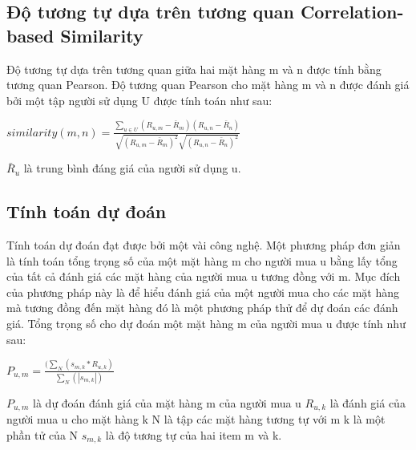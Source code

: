 \subsection{Độ tương tự dựa trên tương quan {Correlation-based Similarity}}

Độ tương tự dựa trên tương quan giữa hai mặt hàng m và n được tính bằng tương quan Pearson. Độ tương quan Pearson cho mặt hàng m và n được đánh giá bởi một tập người sử dụng U được tính toán như sau:
\begin{center}
$similarity(m, n) = \frac{\sum_{u\in U}(R_{u,m}-\bar{R}_{m})(R_{u,n}-\bar{R}_{n})}{\sqrt{(R_{u,m} - \bar{R}_m)^{2}} \sqrt{(R_{u,n} - \bar{R}_n)^{2}}}$
\end{center}
$\bar{R}_{u}$ là trung bình đáng giá của người sử dụng u.
\subsection{Tính toán dự đoán} 
Tính toán dự đoán đạt được bởi một vài công nghệ. Một phương pháp đơn giản là tính toán tổng trọng số của một mặt hàng m cho người mua u bằng lấy tổng của tất cả đánh giá các mặt hàng của người mua u tương đồng với m. Mục đích của phương pháp này là để hiểu đánh giá của một người mua cho các mặt hàng mà tương đồng đến mặt hàng đó là một phương pháp thử để dự đoán các đánh giá. Tổng trọng số cho dự đoán một mặt hàng m của người mua u được tính như sau:
\begin{center}
$P_{u, m} = \frac{(\sum_{N}(s_{m,k}*R_{u,k})}{\sum_{N}(|s_{m,k}|)}$
\end{center}
$P_{u, m}$ là dự đoán đánh giá của mặt hàng m của người mua u 
$R_{u, k}$ là đánh giá của người mua u cho mặt hàng k
N là tập các mặt hàng tương tự với m
k là một phần tử của N
$s_{m, k}$ là độ tương tự của hai item m và k.

